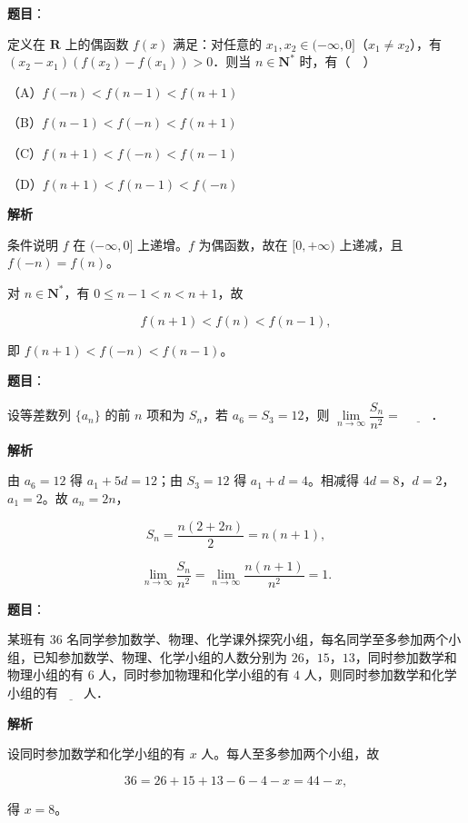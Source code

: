\begin{answer}

\textbf{题目}：

定义在 $\mathbf R$ 上的偶函数 $f(x)$ 满足：对任意的 $x_1,x_2\in(-\infty,0]$（$x_1\neq x_2$），有 $(x_2-x_1)(f(x_2)-f(x_1))>0$．则当 $n\in\mathbf N^*$ 时，有（　）

（A）$f(-n)<f(n-1)<f(n+1)$

（B）$f(n-1)<f(-n)<f(n+1)$

（C）$f(n+1)<f(-n)<f(n-1)$

（D）$f(n+1)<f(n-1)<f(-n)$

\textbf{解析}

条件说明 $f$ 在 $(-\infty,0]$ 上递增。$f$ 为偶函数，故在 $[0,+\infty)$ 上递减，且 $f(-n)=f(n)$。

对 $n\in\mathbf N^*$，有 $0\leqslant n-1<n<n+1$，故

\nopagebreak[4]
\[f(n+1)<f(n)<f(n-1),\]

即 $f(n+1)<f(-n)<f(n-1)$。


\end{answer}
\begin{answer}

\textbf{题目}：

设等差数列 $\{a_n\}$ 的前 $n$ 项和为 $S_n$，若 $a_6=S_3=12$，则 $\lim\limits_{n\to\infty}\dfrac{S_n}{n^2}=$ $\underline{\qquad}$．

\textbf{解析}

由 $a_6=12$ 得 $a_1+5d=12$；由 $S_3=12$ 得 $a_1+d=4$。相减得 $4d=8$，$d=2$，$a_1=2$。故 $a_n=2n$，

\nopagebreak[4]
\[S_n=\frac{n(2+2n)}2=n(n+1),\]

\nopagebreak[4]
\[\lim_{n\to\infty}\frac{S_n}{n^2}=\lim_{n\to\infty}\frac{n(n+1)}{n^2}=1.\]


\end{answer}
\begin{answer}

\textbf{题目}：

某班有 $36$ 名同学参加数学、物理、化学课外探究小组，每名同学至多参加两个小组，已知参加数学、物理、化学小组的人数分别为 $26$，$15$，$13$，同时参加数学和物理小组的有 $6$ 人，同时参加物理和化学小组的有 $4$ 人，则同时参加数学和化学小组的有$\underline{\qquad}$人．

\textbf{解析}

设同时参加数学和化学小组的有 $x$ 人。每人至多参加两个小组，故

\nopagebreak[4]
\[36=26+15+13-6-4-x=44-x,\]

得 $x=8$。


\end{answer}
